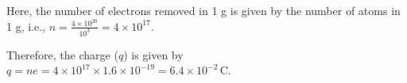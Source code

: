 Here, the number of electrons removed in 1 g is given by the number of atoms in 1 g, i.e., \( n = \frac{4 \times 10^{20}}{10^{3}} = 4 \times 10^{17} \).

Therefore, the charge (\( q \)) is given by \( q = n e = 4 \times 10^{17} \times 1.6 \times 10^{-19} = 6.4 \times 10^{-2} \, \text{C} \).
